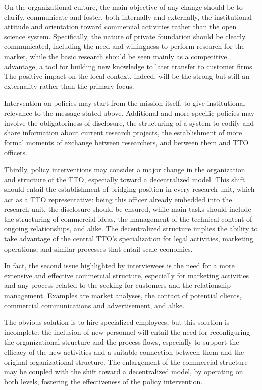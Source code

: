 On the organizational culture, the main objective of any change should be to clarify, communicate and foster, both internally and externally, the institutional attitude and orientation toward commercial activities rather than the open science system. Specifically, the nature of private foundation should be clearly communicated, including the need and willingness to perform research for the market, while the basic research should be seen mainly as a competitive advantage, a tool for building new knowledge to later transfer to customer firms. The positive impact on the local context, indeed, will be the strong but still an externality rather than the primary focus. 

Intervention on policies may start from the mission itself, to give institutional relevance to the message stated above. Additional and more specific policies may involve the obligatoriness of disclosure, the structuring of a system to codify and share information about current research projects, the establishment of more formal moments of exchange between researchers, and between them and TTO officers.

Thirdly, policy interventions may consider a major change in the organization and structure of the TTO, especially toward a decentralized model. This shift should entail the establishment of bridging position in every research unit, which act as a TTO representative: being this officer already embedded into the research unit, the disclosure should be ensured, while main tasks should include the structuring of commercial ideas, the management of the technical content of ongoing relationships, and alike. The decentralized structure implies the ability to take advantage of the central TTO's specialization for legal activities, marketing operations, and similar processes that entail scale economies.

In fact, the second issue highlighted by interviewees is the need for a more extensive and effective commercial structure, especially for marketing activities and any process related to the seeking for customers and the relationship management. Examples are market analyses, the contact of potential clients, commercial communications and advertisement, and alike. 

The obvious solution is to hire specialized employees, but this solution is incomplete: the inclusion of new personnel will entail the need for reconfiguring the organizational structure and the process flows, especially to support the efficacy of the new activities and a suitable connection between them and the original organizational structure. The enlargement of the commercial structure may be coupled with the shift toward a decentralized model, by operating on both levels, fostering the effectiveness of the policy intervention.

